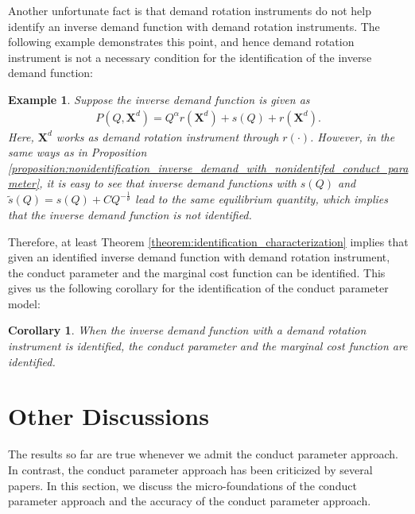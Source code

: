 \documentclass[11pt, a4paper]{article}
\newtheorem{corollary}{Corollary}
\newtheorem{example}{Example}
\begin{document}
Another unfortunate fact is that demand rotation instruments do not help identify an inverse demand function with demand rotation instruments.
The following example demonstrates this point, and hence demand rotation instrument is not a necessary condition for the identification of the inverse demand function:
\begin{example}\label{example:demand_rotation_instrument_does_not_help_identification}
    Suppose the inverse demand function is given as
    \begin{align}
        P(Q, \bm{X}^{d}) = Q^{\alpha}r(\bm{X}^{d}) + s(Q) + r(\bm{X}^{d}).
    \end{align}
    Here, $\bm{X}^{d}$ works as demand rotation instrument through $r(\cdot)$.
    However, in the same ways as in Proposition \ref{proposition:nonidentification_inverse_demand_with_nonidentifed_conduct_parameter}, it is easy to see that inverse demand functions with $s(Q)$ and $\tilde{s}(Q) = s(Q) + C Q^{-\frac{1}{\theta}}$ lead to the same equilibrium quantity, which implies that the inverse demand function is not identified.
\end{example}

Therefore, at least Theorem \ref{theorem:identification_characterization} implies that given an identified inverse demand function with demand rotation instrument, the conduct parameter and the marginal cost function can be identified.
This gives us the following corollary for the identification of the conduct parameter model:
\begin{corollary}\label{corollary:identification_conduct_parameter_model}
    When the inverse demand function with a demand rotation instrument is identified, the conduct parameter and the marginal cost function are identified.
\end{corollary}




\section{Other Discussions}\label{sec:other_discussions}
The results so far are true whenever we admit the conduct parameter approach.
In contrast, the conduct parameter approach has been criticized by several papers.
In this section, we discuss the micro-foundations of the conduct parameter approach and the accuracy of the conduct parameter approach.
\end{document}
